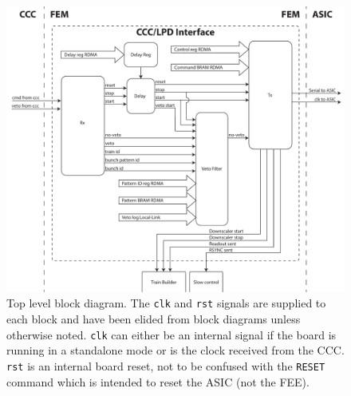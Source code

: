 \begin{figure}[htbp]
  \centering
  \includegraphics[width=\textwidth]{images/pdfs/ccc_interface_block.pdf}
  \caption{Top level block diagram. The \texttt{clk} and \texttt{rst} signals are supplied to each block and have been elided from block diagrams unless otherwise noted. \texttt{clk} can either be an internal signal if the board is running in a standalone mode or is the clock received from the CCC. \texttt{rst} is an internal board reset, not to be confused with the \texttt{RESET} command which is intended to reset the ASIC (not the FEE).}
  \label{fig:ccc_interface_entity}
\end{figure}

